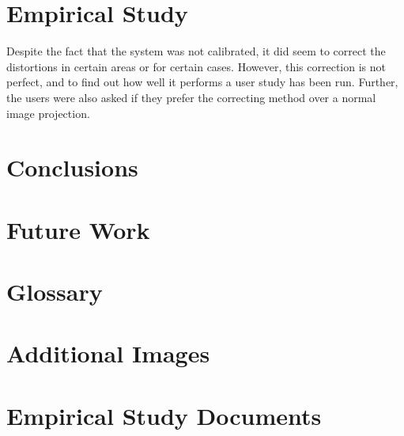 \documentclass[]{article}
\begin{document}
\newpage
\newpage
\section{Empirical Study}
\label{sec:EmpiricalStudy}

Despite the fact that the system was not calibrated, it did seem to correct the distortions in certain areas or for certain cases. However, this correction is not perfect, and to find out how well it performs a user study has been run. Further, the users were also asked if they prefer the correcting method over a normal image projection.

\newpage
\section{Conclusions}
\newpage
\section{Future Work}

\newpage



\newpage

\begin{appendices}

\section{Glossary}
\clearpage{\pagestyle{empty}\cleardoublepage}


\section{ Additional Images}
\label{appendix:B}
\clearpage{\pagestyle{empty}\cleardoublepage}

\section{Empirical Study Documents}
\clearpage{\pagestyle{empty}\cleardoublepage}
\end{appendices}
\end{document}
